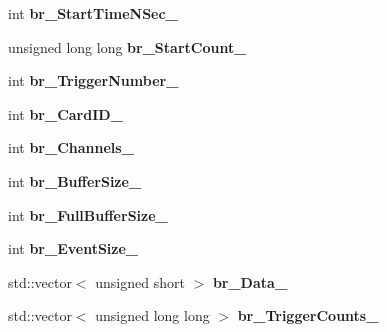 \begin{DoxyCompactItemize}
\item 
\hypertarget{classannie_1_1RawReader_acefc82540c3fd5a95988dfbbf692115b}{int {\bfseries br\-\_\-\-Start\-Time\-N\-Sec\-\_\-}}\label{classannie_1_1RawReader_acefc82540c3fd5a95988dfbbf692115b}

\item 
\hypertarget{classannie_1_1RawReader_a3086ab236b86a0d8a49730d7819d28a1}{unsigned long long {\bfseries br\-\_\-\-Start\-Count\-\_\-}}\label{classannie_1_1RawReader_a3086ab236b86a0d8a49730d7819d28a1}

\item 
\hypertarget{classannie_1_1RawReader_ac64c20dac5983b21e223c531695d5261}{int {\bfseries br\-\_\-\-Trigger\-Number\-\_\-}}\label{classannie_1_1RawReader_ac64c20dac5983b21e223c531695d5261}

\item 
\hypertarget{classannie_1_1RawReader_a712e7052ba063133d8a8ec305b971ddd}{int {\bfseries br\-\_\-\-Card\-I\-D\-\_\-}}\label{classannie_1_1RawReader_a712e7052ba063133d8a8ec305b971ddd}

\item 
\hypertarget{classannie_1_1RawReader_a7aedb6d5ef04647ab4be754406de8d77}{int {\bfseries br\-\_\-\-Channels\-\_\-}}\label{classannie_1_1RawReader_a7aedb6d5ef04647ab4be754406de8d77}

\item 
\hypertarget{classannie_1_1RawReader_ab333ebd2c9c21fc9d745b77073280e2d}{int {\bfseries br\-\_\-\-Buffer\-Size\-\_\-}}\label{classannie_1_1RawReader_ab333ebd2c9c21fc9d745b77073280e2d}

\item 
\hypertarget{classannie_1_1RawReader_afa644ab3780bc0b5a4ea82be84fe0718}{int {\bfseries br\-\_\-\-Full\-Buffer\-Size\-\_\-}}\label{classannie_1_1RawReader_afa644ab3780bc0b5a4ea82be84fe0718}

\item 
\hypertarget{classannie_1_1RawReader_ac897918c63ff74d5b9562d33d9ed97e2}{int {\bfseries br\-\_\-\-Event\-Size\-\_\-}}\label{classannie_1_1RawReader_ac897918c63ff74d5b9562d33d9ed97e2}

\item 
\hypertarget{classannie_1_1RawReader_a6d0521fb16690c0db87d279f66cf5291}{std\-::vector$<$ unsigned short $>$ {\bfseries br\-\_\-\-Data\-\_\-}}\label{classannie_1_1RawReader_a6d0521fb16690c0db87d279f66cf5291}

\item 
\hypertarget{classannie_1_1RawReader_a92130fb80e359c5f21840cb29138f9af}{std\-::vector$<$ unsigned long long $>$ {\bfseries br\-\_\-\-Trigger\-Counts\-\_\-}}\label{classannie_1_1RawReader_a92130fb80e359c5f21840cb29138f9af}


\end{DoxyCompactItemize}
